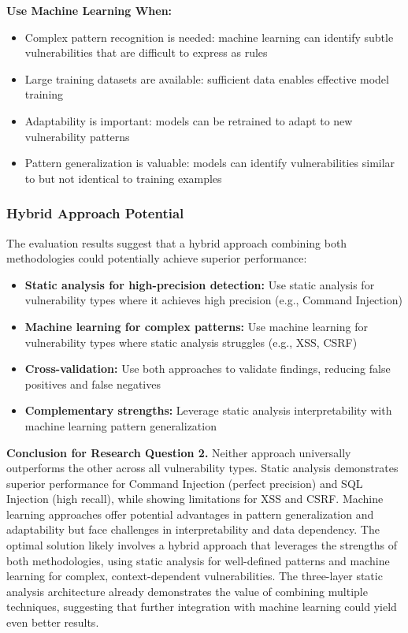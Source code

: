 \textbf{Use Machine Learning When:}
\begin{itemize}
	\item Complex pattern recognition is needed: machine learning can identify subtle vulnerabilities that are difficult to express as rules
	\item Large training datasets are available: sufficient data enables effective model training
	\item Adaptability is important: models can be retrained to adapt to new vulnerability patterns
	\item Pattern generalization is valuable: models can identify vulnerabilities similar to but not identical to training examples
\end{itemize}

\subsubsection{Hybrid Approach Potential}
\label{sec:hybrid_approach}

The evaluation results suggest that a hybrid approach combining both methodologies could potentially achieve superior performance:
\begin{itemize}
	\item \textbf{Static analysis for high-precision detection:} Use static analysis for vulnerability types where it achieves high precision (e.g., Command Injection)
	\item \textbf{Machine learning for complex patterns:} Use machine learning for vulnerability types where static analysis struggles (e.g., XSS, CSRF)
	\item \textbf{Cross-validation:} Use both approaches to validate findings, reducing false positives and false negatives
	\item \textbf{Complementary strengths:} Leverage static analysis interpretability with machine learning pattern generalization
\end{itemize}

\textbf{Conclusion for Research Question 2.}
Neither approach universally outperforms the other across all vulnerability types. Static analysis demonstrates superior performance for Command Injection (perfect precision) and SQL Injection (high recall), while showing limitations for XSS and CSRF. Machine learning approaches offer potential advantages in pattern generalization and adaptability but face challenges in interpretability and data dependency. The optimal solution likely involves a hybrid approach that leverages the strengths of both methodologies, using static analysis for well-defined patterns and machine learning for complex, context-dependent vulnerabilities. The three-layer static analysis architecture already demonstrates the value of combining multiple techniques, suggesting that further integration with machine learning could yield even better results.

